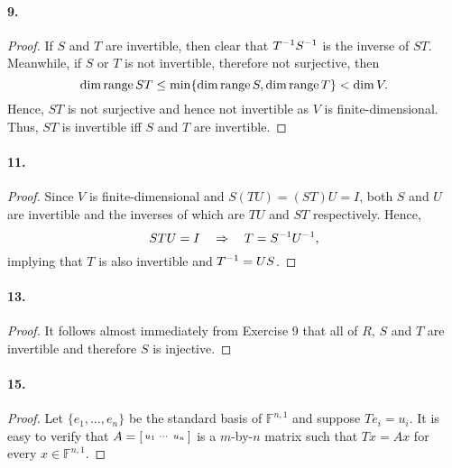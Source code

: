   \paragraph{9.}
  \begin{proof}
    If $S$ and $T$ are invertible, then clear that $T^{-1} S^{-1}$ is the inverse
    of $ST$. Meanwhile, if $S$ or $T$ is not invertible, therefore not 
    surjective, then 
    \[
      \dim\operatorname{range} ST\le\min\{\dim\operatorname{range} S,\dim\operatorname{range} T\}<\dim V.
    \]
    Hence, $ST$ is not surjective and hence not invertible as $V$ is 
    finite-dimensional. Thus, $ST$ is invertible iff $S$ and $T$ are invertible.
  \end{proof}

  \paragraph{11.}
  \begin{proof}
    Since $V$ is finite-dimensional and $S(TU)=(ST)U=I$, both $S$ and $U$ are 
    invertible and the inverses of which are $TU$ and $ST$ respectively. Hence,
    \[
      STU=I \quad\Rightarrow\quad T = S^{-1} U^{-1},
    \]
    implying that $T$ is also invertible and $T^{-1} = US$.
  \end{proof}

  \paragraph{13.}
  \begin{proof}
    It follows almost immediately from Exercise 9 that all of $R$, $S$ and $T$
    are invertible and therefore $S$ is injective.
  \end{proof}

  \paragraph{15.}
  \begin{proof}
    Let $\{e_1,\dots,e_n\}$ be the standard basis of $\mathbb{F}^{n,1}$ and 
    suppose $Te_i = u_i$. It is easy to verify that $A=\begin{bsmallmatrix}
    u_1 & \cdots & u_n \end{bsmallmatrix}$ is a $m$-by-$n$ matrix such that 
    $Tx=Ax$ for every $x\in\mathbb{F}^{n,1}$.
  \end{proof}
